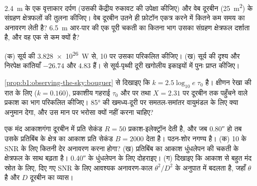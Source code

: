 \begin{exercise}[$\star\star$]\label{exo:b1:observing-the-sky:8}
\qty{2.4}{m} के एक वृत्ताकार दर्पण (उसकी केंद्रीय रुकावट की उपेक्षा कीजिए) और वेब दूरबीन
(\qty{25}{m^2}) के संग्रहण क्षेत्रफलों की तुलना कीजिए। वेब दूरबीन उतने ही फ़ोटॉन एकत्र करने में
कितने कम समय का अनावरण लेती है? \qty{6.5}{m} आर-पार की एक पूरी चकती का कितना भाग उसका संग्रहण
क्षेत्रफल दर्शाता है, और वह एक से कम क्यों है?
\end{exercise}

\begin{exercise}[$\star\star$]\label{exo:b1:observing-the-sky:9}
(क) सूर्य की  \qty{3.828e26}{W} से, \qty{10}{\parsec} पर उसका  परिकलित कीजिए। (ख) सूर्य की
दृश्य और निरपेक्ष कांतियाँ $-26.74$ और $4.83$ हैं।  से सूर्य-पृथ्वी दूरी खगोलीय इकाइयों
में पुनः प्राप्त कीजिए।
\end{exercise}

\begin{exercise}[$\star\star\star$]\label{exo:b1:observing-the-sky:10}
\cref{prop:b1:observing-the-sky:bouguer} से दिखाइए कि $k =
2.5\log_{10}e\;\tau_0$ है। क्षीणन रेखा की रात के लिए ($k =
\num{0.160}$),  प्रकाशीय गहराई $\tau_0$ और  पर तथा $X = 2.31$ पर दूरबीन तक पहुँचने वाले
प्रकाश का भाग परिकलित कीजिए। \ang{85} की खमध्य-दूरी पर समतल-समांतर वायुमंडल  के लिए क्या
अनुमान देगा, और उस मान पर भरोसा क्यों नहीं करना चाहिए?
\end{exercise}

\begin{exercise}[$\star\star\star$]\label{exo:b1:observing-the-sky:11}
एक मंद आकाशगंगा दूरबीन में प्रति सेकंड $R = 50$ प्रकाश-इलेक्ट्रॉन देती है, और जब 
\ang{;;0.80} हो तब उसके प्रतिबिंब के क्षेत्र का आकाश प्रति सेकंड $B = \num{2000}$ देता है। पठन-शोर
नगण्य है। (क) 10 के SNR के लिए कितनी देर अनावरण करना होगा? (ख) प्रतिबिंब का आकाश धुंधलेपन की चकती
के क्षेत्रफल के साथ बढ़ता है। \ang{;;0.40} के धुंधलेपन के लिए दोहराइए। (ग) दिखाइए कि आकाश से बहुत
मंद स्रोत के लिए, दिए गए SNR के लिए आवश्यक अनावरण-काल $\theta^2/D^2$ के अनुपात में बदलता है, जहाँ
$\theta$  है और $D$ दूरबीन का व्यास।
\end{exercise}

